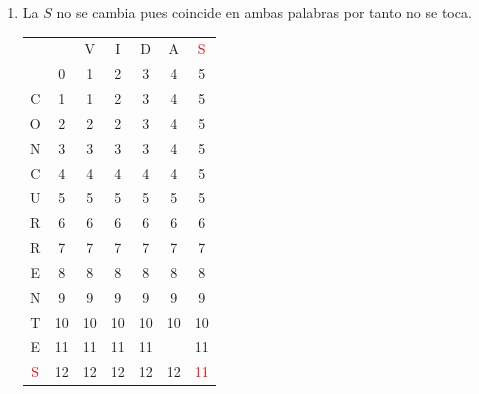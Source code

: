 \documentclass[10pt,a4paper,spanish]{report}
\theoremstyle{definition}
\theoremstyle{remark}
\begin{document}
\begin{enumerate}
    \item La $S$ no se cambia pues coincide en ambas palabras por tanto no se toca.
    \begin{center}
\begin{tabular}{c|c|c|c|c|c|c|}
\multicolumn{2}{r}{} & \multicolumn{1}{c}{V} & \multicolumn{1}{c}{I} & \multicolumn{1}{c}{D} & \multicolumn{1}{c}{A} & \multicolumn{1}{c}{\textcolor{Red}{S}} \\ 
\cline{2-7} 
& $0$ & 1 & 2 & 3 & 4 & 5 \\
\cline{2-7} 
C & 1 & 1 & 2 & 3 & 4 & 5 \\
\cline{2-7}
O & 2 & 2 & 2 & 3 & 4 & 5 \\
\cline{2-7} 
N & 3 & 3 & 3 & 3 & 4 & 5 \\
\cline{2-7} 
C & 4 & 4 & 4 & 4 & 4 & 5 \\
\cline{2-7} 
U & 5 & 5 & 5 & 5 & 5 & 5 \\
\cline{2-7} 
R & 6 & 6 & 6 & 6 & 6 & 6 \\
\cline{2-7} 
R & 7 & 7 & 7 & 7 & 7 & 7 \\
\cline{2-7} 
E & 8 & 8 & 8 & 8 & 8 & 8 \\
\cline{2-7} 
N & 9 & 9 & 9 & 9 & 9 & 9 \\
\cline{2-7} 
T & 10 & 10 & 10 & 10 & 10 & 10 \\
\cline{2-7} 
E & 11 & 11 & 11 & 11 & \cellcolor{Cyan}{11} & 11 \\
\cline{2-7} 
\textcolor{Red}{S} & 12 & 12 & 12 & 12 & 12 & \cellcolor{Green}\textcolor{Red}{11} \\
\cline{2-7}
\end{tabular}
\end{center}


\end{enumerate}
\end{document}
